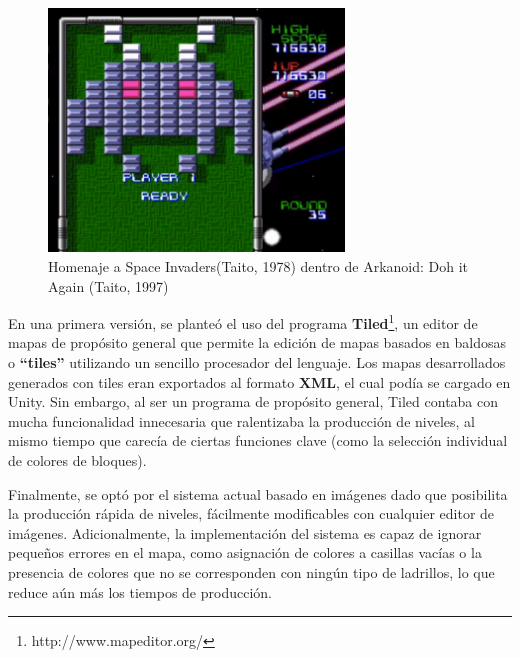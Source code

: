 \begin{figure}[h]
	\includegraphics[width=0.7\textwidth]{images/estructura/niveles/ejemplo-arkanoid}
	\centering
	\caption{Homenaje a Space Invaders(Taito, 1978) dentro de Arkanoid: Doh it Again (Taito, 1997)}
	\label{ejemplo-arkanoid}
\end{figure}

En una primera versión, se planteó el uso del programa \textbf{Tiled}\footnote{http://www.mapeditor.org/}, un editor de mapas de propósito general que permite la edición de mapas basados en baldosas o \textbf{``tiles''} utilizando un sencillo procesador del lenguaje. Los mapas desarrollados generados con tiles eran exportados al formato \textbf{XML}, el cual podía se cargado en Unity. Sin embargo, al ser un programa de propósito general, Tiled contaba con mucha funcionalidad innecesaria que ralentizaba la producción de niveles, al mismo tiempo que carecía de ciertas funciones clave (como la selección individual de colores de bloques).

Finalmente, se optó por el sistema actual basado en imágenes dado que posibilita la producción rápida de niveles, fácilmente modificables con cualquier editor de imágenes. Adicionalmente, la implementación del sistema es capaz de ignorar pequeños errores en el mapa, como asignación de colores a casillas vacías o la presencia de colores que no se corresponden con ningún tipo de ladrillos, lo que reduce aún más los tiempos de producción.

